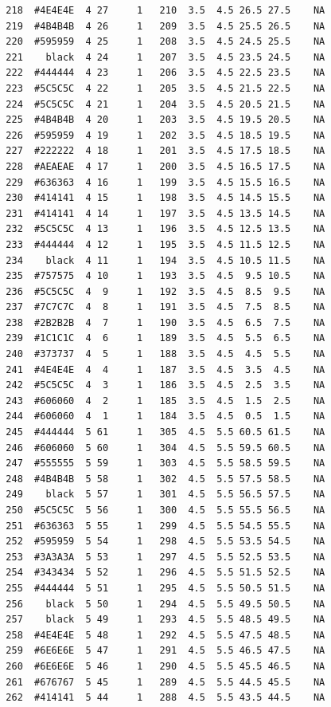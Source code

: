 \documentclass[12pt,twoside]{reedthesis}
\begin{document}
\begin{verbatim}
  218  #4E4E4E  4 27     1   210  3.5  4.5 26.5 27.5    NA
  219  #4B4B4B  4 26     1   209  3.5  4.5 25.5 26.5    NA
  220  #595959  4 25     1   208  3.5  4.5 24.5 25.5    NA
  221    black  4 24     1   207  3.5  4.5 23.5 24.5    NA
  222  #444444  4 23     1   206  3.5  4.5 22.5 23.5    NA
  223  #5C5C5C  4 22     1   205  3.5  4.5 21.5 22.5    NA
  224  #5C5C5C  4 21     1   204  3.5  4.5 20.5 21.5    NA
  225  #4B4B4B  4 20     1   203  3.5  4.5 19.5 20.5    NA
  226  #595959  4 19     1   202  3.5  4.5 18.5 19.5    NA
  227  #222222  4 18     1   201  3.5  4.5 17.5 18.5    NA
  228  #AEAEAE  4 17     1   200  3.5  4.5 16.5 17.5    NA
  229  #636363  4 16     1   199  3.5  4.5 15.5 16.5    NA
  230  #414141  4 15     1   198  3.5  4.5 14.5 15.5    NA
  231  #414141  4 14     1   197  3.5  4.5 13.5 14.5    NA
  232  #5C5C5C  4 13     1   196  3.5  4.5 12.5 13.5    NA
  233  #444444  4 12     1   195  3.5  4.5 11.5 12.5    NA
  234    black  4 11     1   194  3.5  4.5 10.5 11.5    NA
  235  #757575  4 10     1   193  3.5  4.5  9.5 10.5    NA
  236  #5C5C5C  4  9     1   192  3.5  4.5  8.5  9.5    NA
  237  #7C7C7C  4  8     1   191  3.5  4.5  7.5  8.5    NA
  238  #2B2B2B  4  7     1   190  3.5  4.5  6.5  7.5    NA
  239  #1C1C1C  4  6     1   189  3.5  4.5  5.5  6.5    NA
  240  #373737  4  5     1   188  3.5  4.5  4.5  5.5    NA
  241  #4E4E4E  4  4     1   187  3.5  4.5  3.5  4.5    NA
  242  #5C5C5C  4  3     1   186  3.5  4.5  2.5  3.5    NA
  243  #606060  4  2     1   185  3.5  4.5  1.5  2.5    NA
  244  #606060  4  1     1   184  3.5  4.5  0.5  1.5    NA
  245  #444444  5 61     1   305  4.5  5.5 60.5 61.5    NA
  246  #606060  5 60     1   304  4.5  5.5 59.5 60.5    NA
  247  #555555  5 59     1   303  4.5  5.5 58.5 59.5    NA
  248  #4B4B4B  5 58     1   302  4.5  5.5 57.5 58.5    NA
  249    black  5 57     1   301  4.5  5.5 56.5 57.5    NA
  250  #5C5C5C  5 56     1   300  4.5  5.5 55.5 56.5    NA
  251  #636363  5 55     1   299  4.5  5.5 54.5 55.5    NA
  252  #595959  5 54     1   298  4.5  5.5 53.5 54.5    NA
  253  #3A3A3A  5 53     1   297  4.5  5.5 52.5 53.5    NA
  254  #343434  5 52     1   296  4.5  5.5 51.5 52.5    NA
  255  #444444  5 51     1   295  4.5  5.5 50.5 51.5    NA
  256    black  5 50     1   294  4.5  5.5 49.5 50.5    NA
  257    black  5 49     1   293  4.5  5.5 48.5 49.5    NA
  258  #4E4E4E  5 48     1   292  4.5  5.5 47.5 48.5    NA
  259  #6E6E6E  5 47     1   291  4.5  5.5 46.5 47.5    NA
  260  #6E6E6E  5 46     1   290  4.5  5.5 45.5 46.5    NA
  261  #676767  5 45     1   289  4.5  5.5 44.5 45.5    NA
  262  #414141  5 44     1   288  4.5  5.5 43.5 44.5    NA

\end{verbatim}
\end{document}
